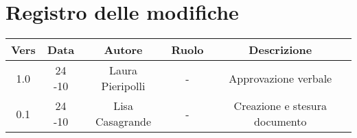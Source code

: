 \section{Registro delle modifiche}

\begin{table}[htbp]
	\begin{tabular}{|c|c|c|c|c|}
		\hline
		\rowcolor[gray]{0.9}
		Vers & Data & Autore & Ruolo & Descrizione \\
		\hline
		1.0 & 24 -10 & Laura Pieripolli & - & Approvazione verbale \\
		\hline
		0.1 & 24 -10 & Lisa Casagrande & - & Creazione e stesura documento \\
		\hline
	\end{tabular}
\end{table}